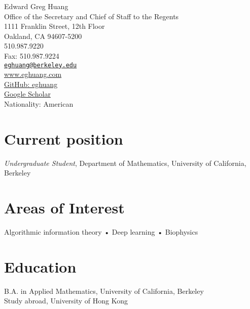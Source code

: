 \documentclass[10pt, letterpaper]{article}
\newcommand{\years}[1]{\marginnote{\scriptsize #1}}
\begin{document}
{\LARGE Edward Greg Huang}\\[1cm]
Office of the Secretary and Chief of Staff to the Regents \\
1111 Franklin Street, 12th Floor \\
Oakland, CA 94607-5200 \\
510.987.9220\\
Fax: 510.987.9224\\


\href{mailto:eghuang@berkeley.edu}{\lstinline{eghuang@berkeley.edu}}\\
\href{https://www.eghuang.com}{www.eghuang.com}\\
\href{https://github.com/eghuang}{GitHub: eghuang}\\
\href{https://scholar.google.com/citations?user=DlUurWMAAAAJ}{Google Scholar}\\

Nationality: American

\section*{Current position}
\emph{Undergraduate Student}, Department of Mathematics, University of California, Berkeley

\section*{Areas of Interest}
 Algorithmic information theory • Deep learning • Biophysics 

\section*{Education}
\noindent
\years{2019}\textsc{B.A.} in Applied Mathematics, University of California, Berkeley\\
\years{2016}Study abroad, University of Hong Kong\\


\end{document}
